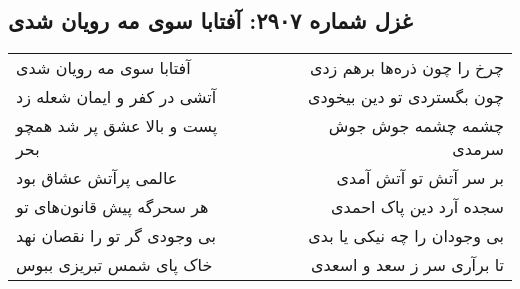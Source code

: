 \begin{center}
\section*{غزل شماره ۲۹۰۷: آفتابا سوی مه رویان شدی}
\label{sec:2907}
\begin{longtable}{l p{0.5cm} r}
آفتابا سوی مه رویان شدی
&&
چرخ را چون ذره‌ها برهم زدی
\\
آتشی در کفر و ایمان شعله زد
&&
چون بگستردی تو دین بیخودی
\\
پست و بالا عشق پر شد همچو بحر
&&
چشمه چشمه جوش جوش سرمدی
\\
عالمی پرآتش عشاق بود
&&
بر سر آتش تو آتش آمدی
\\
هر سحرگه پیش قانون‌های تو
&&
سجده آرد دین پاک احمدی
\\
بی وجودی گر تو را نقصان نهد
&&
بی وجودان را چه نیکی یا بدی
\\
خاک پای شمس تبریزی ببوس
&&
تا برآری سر ز سعد و اسعدی
\\
\end{longtable}
\end{center}
